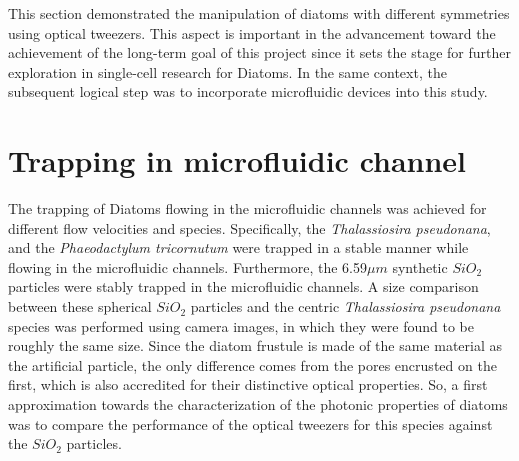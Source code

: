 \documentclass[letterpaper,12pt,oneside]{book}
\begin{document}
\noindent This section demonstrated the manipulation of diatoms with different symmetries using optical tweezers. This aspect is important in the advancement toward the achievement of the long-term goal of this project since it sets the stage for further exploration in single-cell research for Diatoms. In the same context, the subsequent logical step was to incorporate microfluidic devices into this study.
\section{Trapping in microfluidic channel}
The trapping of Diatoms flowing in the microfluidic channels was achieved for different flow velocities and species. Specifically, the \textit{Thalassiosira pseudonana}, and the \textit{Phaeodactylum tricornutum} were trapped in a stable manner while flowing in the microfluidic channels. Furthermore, the 6.59$\mu m$ synthetic $SiO_2$ particles were stably trapped in the microfluidic channels. A size comparison between these spherical $SiO_2$ particles and the centric \textit{Thalassiosira pseudonana} species was performed using camera images, in which they were found to be roughly the same size. Since the diatom frustule is made of the same material as the artificial particle, the only difference comes from the pores encrusted on the first, which is also accredited for their distinctive optical properties. So, a first approximation towards the characterization of the photonic properties of diatoms was to compare the performance of the optical tweezers for this species against the $SiO_2$ particles. 
\end{document}

